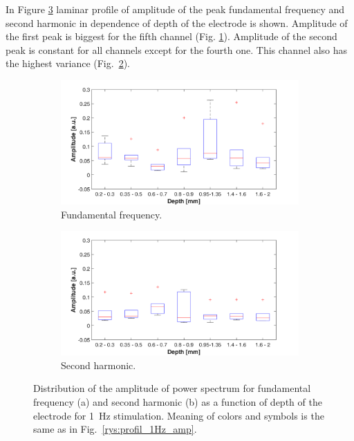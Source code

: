 \documentclass{pracalicmgr}
\begin{document}
    
    
    In Figure \ref{rys:profil_1Hz_wid} laminar profile of amplitude of the peak fundamental frequency and second harmonic in dependence of depth of the electrode is shown. Amplitude of the first peak is biggest for the fifth channel (Fig. \ref{rys:profil_1Hz_wid1}). Amplitude of the second peak is constant for all channels except for the fourth one. This channel also has the highest variance (Fig.~\ref{rys:profil_1Hz_wid2}).
    
    
    \begin{figure}[H]
    	\begin{subfigure}{.5\textwidth}
    		\centering
    		\includegraphics[width=1.\linewidth]{profile_1Hz_wid.png}
    		\caption{Fundamental frequency.}
    		\label{rys:profil_1Hz_wid1}
    	\end{subfigure}%
    	\begin{subfigure}{.5\textwidth}
    		\centering
    		\includegraphics[width=1.\linewidth]{profile_1Hz_wid2.png}
    		\caption{Second harmonic.}
    		\label{rys:profil_1Hz_wid2}
    	\end{subfigure}
    	
    	\caption{Distribution of the amplitude of power spectrum for fundamental frequency (a) and second harmonic (b) as a function of depth of the electrode for 1~Hz stimulation. Meaning of colors and symbols is the same as in Fig.~\ref{rys:profil_1Hz_amp}.}
    	\label{rys:profil_1Hz_wid}
    \end{figure}
    
\end{document}
